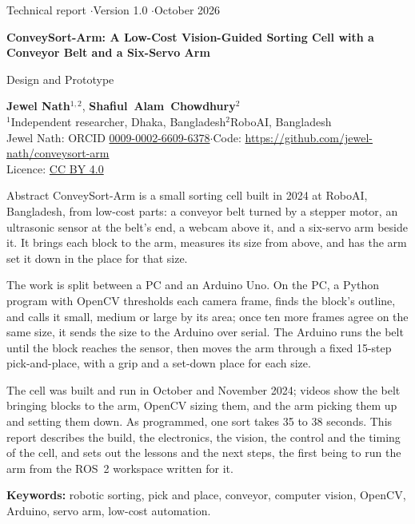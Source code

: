 \documentclass[11pt]{article}
\begin{document}
\thispagestyle{empty}
\begin{tcolorbox}[colback=accent, colframe=accent, arc=3pt, left=14pt, right=14pt, top=14pt, bottom=12pt]
  \color{white}\sffamily\raggedright
  {\small Technical report \quad$\cdot$\quad Version 1.0 \quad$\cdot$\quad October 2026}\par\vspace{8pt}
  {\LARGE\bfseries ConveySort-Arm: A Low-Cost Vision-Guided Sorting Cell with a Conveyor Belt and a Six-Servo Arm}\par\vspace{6pt}
  {\large Design and Prototype}
\end{tcolorbox}

\vspace{4pt}
{\sffamily\raggedright
\textbf{Jewel Nath}$^{1,2}$, \mbox{\textbf{Shafiul Alam Chowdhury}$^{2}$}\\[2pt]
{\small\color{muted}$^{1}$Independent researcher, Dhaka, Bangladesh\quad $^{2}$RoboAI, Bangladesh}\\
{\small\color{muted}Jewel Nath: ORCID \href{https://orcid.org/0009-0002-6609-6378}{0009-0002-6609-6378}\quad$\cdot$\quad Code: \url{https://github.com/jewel-nath/conveysort-arm}}\\
{\small\color{muted}Licence: \href{https://creativecommons.org/licenses/by/4.0/}{CC BY 4.0}}\par}

\vspace{6pt}
\begin{summarybox}{Abstract}
ConveySort-Arm is a small sorting cell built in 2024 at RoboAI, Bangladesh, from low-cost parts: a conveyor belt turned by a stepper motor, an ultrasonic sensor at the belt's end, a webcam above it, and a six-servo arm beside it. It brings each block to the arm, measures its size from above, and has the arm set it down in the place for that size.

The work is split between a PC and an Arduino Uno. On the PC, a Python program with OpenCV thresholds each camera frame, finds the block's outline, and calls it small, medium or large by its area; once ten more frames agree on the same size, it sends the size to the Arduino over serial. The Arduino runs the belt until the block reaches the sensor, then moves the arm through a fixed 15-step pick-and-place, with a grip and a set-down place for each size.

The cell was built and run in October and November 2024; videos show the belt bringing blocks to the arm, OpenCV sizing them, and the arm picking them up and setting them down. As programmed, one sort takes 35 to 38 seconds. This report describes the build, the electronics, the vision, the control and the timing of the cell, and sets out the lessons and the next steps, the first being to run the arm from the ROS~2 workspace written for it.

\smallskip
{\sffamily\small\textbf{Keywords:} robotic sorting, pick and place, conveyor, computer vision, OpenCV, Arduino, servo arm, low-cost automation.}
\end{summarybox}
\end{document}
